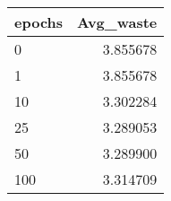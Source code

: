 \begin{tabular}{lr}
\toprule
epochs &  Avg\_waste \\
\midrule
     0 &   3.855678 \\
     1 &   3.855678 \\
    10 &   3.302284 \\
    25 &   3.289053 \\
    50 &   3.289900 \\
   100 &   3.314709 \\
\bottomrule
\end{tabular}
